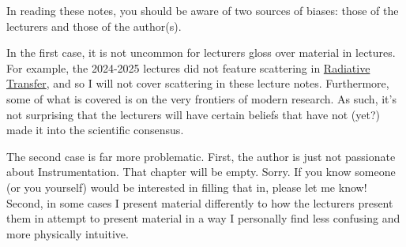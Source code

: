 \documentclass[a4paper,11pt]{report}
\begin{document}
\begin{sloppypar}
\begin{comment}
  Despite the vast diversity in C5, there are a few common themes (which are by no means unique to C5) that pop up throughout the course. I'll try to flag them clearly so that the reader can hopefully experience some kind of continuity when studying this course.  I have in mind three key themes:
  \begin{enumerate}
      \item The Role of \textbf{Scales}: The atmospheres and oceans are complex systems consisting of various phenomena on multiple spatio-temporal scales. At times we will exploit this by either a) noting empirical facts regarding the spatio-temporal scale of a phenomenon, or b) specifying a spatio-temporal scale to focus on a phenomenon.
      \item The Role of \textbf{Assumptions}: We'll make many assumptions throughout this course to simplify and solve the equations governing the phenomena under consideration. It's worth always keeping in mind the validity of this assumption, and why we make it. Sometimes, we make an assumptions simply for teaching purposes: real climate models numerically integrate this. Other times, the assumption. Sometimes assumptions are valid not simply due to luck but due to dynamical reasons that force it to be the case.
      \item A 3rd theme idk lol:
  \end{enumerate}
\end{comment}

In reading these notes, you should be aware of two sources of biases: those of the lecturers and those of the author(s).

In the first case, it is not uncommon for lecturers gloss over material in lectures. For example, the 2024-2025 lectures did not feature scattering in \hyperref[Radiative Transfer]{Radiative Transfer}, and so I will not cover scattering in these lecture notes. Furthermore, some of what is covered is on the very frontiers of modern research. As such, it's not surprising that the lecturers will have certain beliefs that have not (yet?) made it into the scientific consensus.  

The second case is far more problematic. First, the author is just not passionate about Instrumentation. That chapter will be empty. Sorry. If you know someone (or you yourself) would be interested in filling that in, please let me know! Second, in some cases I present material differently to how the lecturers present them in attempt to present material in a way I personally find less confusing and more physically intuitive. 


\end{sloppypar}
\end{document}
